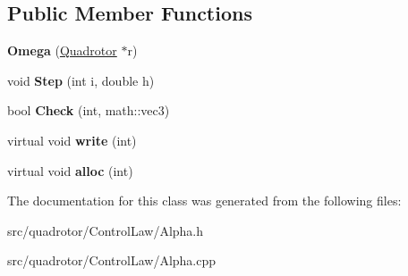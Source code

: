 \subsection*{\-Public \-Member \-Functions}
\begin{DoxyCompactItemize}
\item 
\hypertarget{classAlpha1_1_1Omega_a32a0b92a692f2e8aeecab24d5679bfaf}{{\bfseries \-Omega} (\hyperlink{classQuadrotor}{\-Quadrotor} $\ast$r)}\label{classAlpha1_1_1Omega_a32a0b92a692f2e8aeecab24d5679bfaf}

\item 
\hypertarget{classAlpha1_1_1Omega_ad5ee7dce47604f655179fa60a262e993}{void {\bfseries \-Step} (int i, double h)}\label{classAlpha1_1_1Omega_ad5ee7dce47604f655179fa60a262e993}

\item 
\hypertarget{classAlpha1_1_1Omega_a1e6326c0e02fa47343c92e22adaa37c1}{bool {\bfseries \-Check} (int, math\-::vec3)}\label{classAlpha1_1_1Omega_a1e6326c0e02fa47343c92e22adaa37c1}

\item 
\hypertarget{classAlpha1_1_1Omega_a43530dec2383d0dc669faf55f4d3aab8}{virtual void {\bfseries write} (int)}\label{classAlpha1_1_1Omega_a43530dec2383d0dc669faf55f4d3aab8}

\item 
\hypertarget{classAlpha1_1_1Omega_ad24c9b64337b0a74c42675590664ed7c}{virtual void {\bfseries alloc} (int)}\label{classAlpha1_1_1Omega_ad24c9b64337b0a74c42675590664ed7c}

\end{DoxyCompactItemize}


\-The documentation for this class was generated from the following files\-:\begin{DoxyCompactItemize}
\item 
src/quadrotor/\-Control\-Law/\-Alpha.\-h\item 
src/quadrotor/\-Control\-Law/\-Alpha.\-cpp\end{DoxyCompactItemize}
